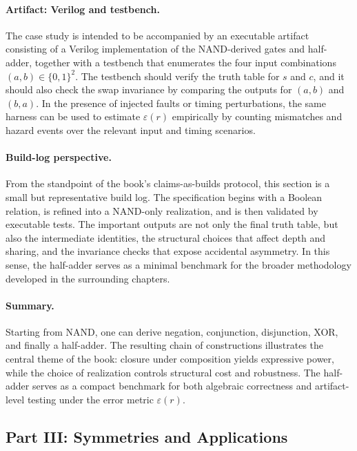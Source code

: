 \documentclass[11pt]{article}
\begin{document}
\paragraph{Artifact: Verilog and testbench.}
The case study is intended to be accompanied by an executable artifact consisting of a Verilog implementation of the NAND-derived gates and half-adder, together with a testbench that enumerates the four input combinations \((a,b) \in \{0,1\}^2\). The testbench should verify the truth table for \(s\) and \(c\), and it should also check the swap invariance by comparing the outputs for \((a,b)\) and \((b,a)\). In the presence of injected faults or timing perturbations, the same harness can be used to estimate \(\varepsilon(r)\) empirically by counting mismatches and hazard events over the relevant input and timing scenarios.

\paragraph{Build-log perspective.}
From the standpoint of the book's claims-as-builds protocol, this section is a small but representative build log. The specification begins with a Boolean relation, is refined into a NAND-only realization, and is then validated by executable tests. The important outputs are not only the final truth table, but also the intermediate identities, the structural choices that affect depth and sharing, and the invariance checks that expose accidental asymmetry. In this sense, the half-adder serves as a minimal benchmark for the broader methodology developed in the surrounding chapters.

\paragraph{Summary.}
Starting from NAND, one can derive negation, conjunction, disjunction, XOR, and finally a half-adder. The resulting chain of constructions illustrates the central theme of the book: closure under composition yields expressive power, while the choice of realization controls structural cost and robustness. The half-adder serves as a compact benchmark for both algebraic correctness and artifact-level testing under the error metric \(\varepsilon(r)\).



\subsection{Part III: Symmetries and Applications}
\end{document}

